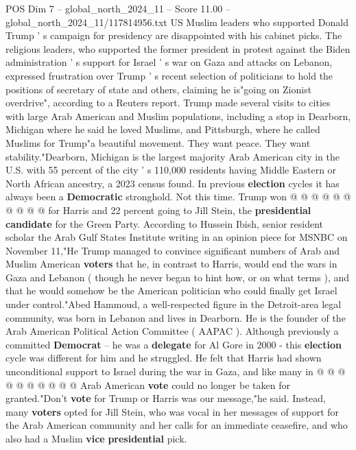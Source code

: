 \begin{textsample}{POS Dim 7 – global\_north\_2024\_11 – Score 11.00 – global\_north\_2024\_11/117814956.txt}  \label{ex:f7_pos_114}
US Muslim leaders who supported Donald Trump ' s campaign for presidency are disappointed with his cabinet picks.
The religious leaders, who supported the former president in protest against the Biden administration ' s support for Israel ' s war on Gaza and attacks on Lebanon, expressed frustration over Trump ' s recent selection of politicians to hold the positions of secretary of state and others, claiming he is"going on Zionist overdrive", according to a Reuters report.
Trump made several visits to cities with large Arab American and Muslim populations, including a stop in Dearborn, Michigan where he said he loved Muslims, and Pittsburgh, where he called Muslims for Trump"a beautiful movement.
They want peace.
They want stability."Dearborn, Michigan is the largest majority Arab American city in the U.S. with 55 percent of the city ' s 110,000 residents having Middle Eastern or North African ancestry, a 2023 census found.
In previous \textbf{election} cycles it has always been a \textbf{Democratic} stronghold.
Not this time.
Trump won @ @ @ @ @ @ @ @ @ @ for Harris and 22 percent going to Jill Stein, the \textbf{presidential} \textbf{candidate} for the Green Party.
According to Hussein Ibish, senior resident scholar the Arab Gulf States Institute writing in an opinion piece for MSNBC on November 11,"He Trump managed to convince significant numbers of Arab and Muslim American \textbf{voters} that he, in contrast to Harris, would end the wars in Gaza and Lebanon ( though he never began to hint how, or on what terms ), and that he would somehow be the American politician who could finally get Israel under control."Abed Hammoud, a well-respected figure in the Detroit-area legal community, was born in Lebanon and lives in Dearborn.
He is the founder of the Arab American Political Action Committee ( AAPAC ).
Although previously a committed \textbf{Democrat} -- he was a \textbf{delegate} for Al Gore in 2000 - this \textbf{election} cycle was different for him and he struggled.
He felt that Harris had shown unconditional support to Israel during the war in Gaza, and like many in @ @ @ @ @ @ @ @ @ @ Arab American \textbf{vote} could no longer be taken for granted."Don't \textbf{vote} for Trump or Harris was our message,"he said.
Instead, many \textbf{voters} opted for Jill Stein, who was vocal in her messages of support for the Arab American community and her calls for an immediate ceasefire, and who also had a Muslim \textbf{vice} \textbf{presidential} pick.

\end{textsample}
